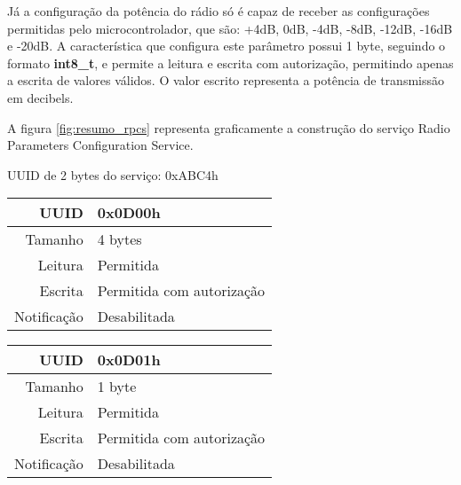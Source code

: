 Já a configuração da potência do rádio só é capaz de receber as configurações
permitidas pelo microcontrolador, que são: +4dB, 0dB, -4dB, -8dB, -12dB, -16dB e
-20dB\cite{nRF51RefManual}. A característica que configura este parâmetro possui
1 byte, seguindo o formato \textbf{int8\_t}, e permite a leitura e escrita com
autorização, permitindo apenas a escrita de valores válidos. O valor escrito
representa a potência de transmissão em decibels.

A figura \ref{fig:resumo_rpcs} representa graficamente a construção do serviço
Radio Parameters Configuration Service.

\begin{tcolorbox}[arc=3mm,fontupper=\small,fonttitle=\bfseries,
subtitle style={boxrule=0.4pt, colback=white},colframe=green!25!black,
halign=center,bottom=0mm,
title=Radio Parameter Configuration Service]
	UUID de 2 bytes do serviço: 0xABC4h
	
	\begin{tcbitemize}[raster columns=2,raster equal height,fontupper=\footnotesize,
	colbacktitle=yellow!100!red!100!black, coltitle=black,
	fonttitle=\footnotesize\bfseries,size=small, halign=center]
	
	\tcbitem [squeezed title={Advertising Interval Characteristic}]
		\begin{tabular}{ r | l }
		UUID & 0x0D00h \\ \hline
		Tamanho & 4 bytes \\ \hline
		Leitura & Permitida \\ \hline
		Escrita & Permitida com autorização \\ \hline
		Notificação & Desabilitada 
		\end{tabular}

		\tcbitem [squeezed title={Advertising TX Power Characteristic}]
		\begin{tabular}{ r | l }
		UUID & 0x0D01h \\ \hline
		Tamanho & 1 byte \\ \hline
		Leitura & Permitida \\ \hline
		Escrita & Permitida com autorização \\ \hline
		Notificação & Desabilitada 
		\end{tabular}

	\end{tcbitemize}
	\tcblower
	\label{fig:resumo_rpcs}
\end{tcolorbox}


